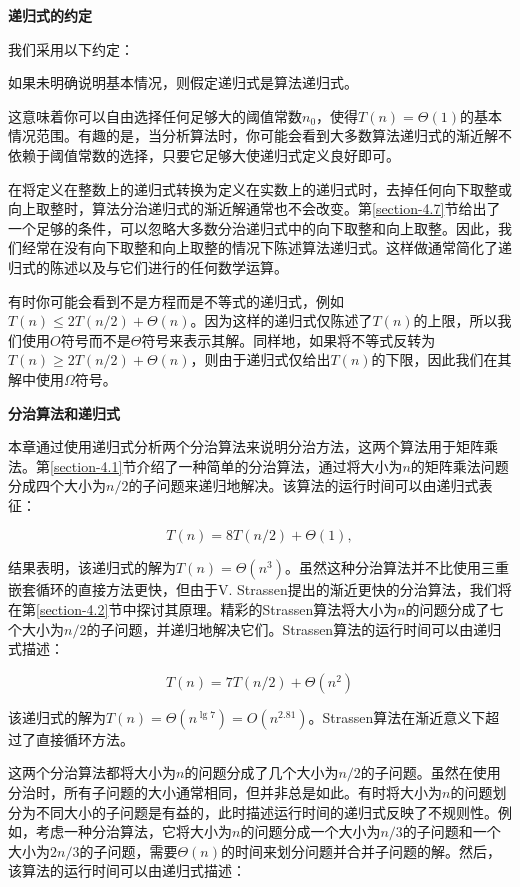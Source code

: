 \documentclass[lang=cn,newtx,10pt,scheme=chinese]{elegantbook}
\begin{document}
\textbf{递归式的约定}

我们采用以下约定：

\begin{tcolorbox}
如果未明确说明基本情况，则假定递归式是算法递归式。
\end{tcolorbox}

这意味着你可以自由选择任何足够大的阈值常数$n_0$，使得$T(n)=\Theta(1)$的基本情况范围。有趣的是，当分析算法时，你可能会看到大多数算法递归式的渐近解不依赖于阈值常数的选择，只要它足够大使递归式定义良好即可。

在将定义在整数上的递归式转换为定义在实数上的递归式时，去掉任何向下取整或向上取整时，算法分治递归式的渐近解通常也不会改变。第\ref{section-4.7}节给出了一个足够的条件，可以忽略大多数分治递归式中的向下取整和向上取整。因此，我们经常在没有向下取整和向上取整的情况下陈述算法递归式。这样做通常简化了递归式的陈述以及与它们进行的任何数学运算。

有时你可能会看到不是方程而是不等式的递归式，例如$T(n) \leq 2 T(n / 2)+\Theta(n)$。因为这样的递归式仅陈述了$T(n)$的上限，所以我们使用$O$符号而不是$\Theta$符号来表示其解。同样地，如果将不等式反转为$T(n)\geq 2T(n/2)+\Theta(n)$，则由于递归式仅给出$T(n)$的下限，因此我们在其解中使用$\Omega$符号。

\textbf{分治算法和递归式}

本章通过使用递归式分析两个分治算法来说明分治方法，这两个算法用于矩阵乘法。第\ref{section-4.1}节介绍了一种简单的分治算法，通过将大小为$n$的矩阵乘法问题分成四个大小为$n/2$的子问题来递归地解决。该算法的运行时间可以由递归式表征：

$$
T(n)=8 T(n / 2)+\Theta(1),
$$

结果表明，该递归式的解为$T(n)=\Theta(n^3)$。虽然这种分治算法并不比使用三重嵌套循环的直接方法更快，但由于V. Strassen提出的渐近更快的分治算法，我们将在第\ref{section-4.2}节中探讨其原理。精彩的Strassen算法将大小为$n$的问题分成了七个大小为$n/2$的子问题，并递归地解决它们。Strassen算法的运行时间可以由递归式描述：

$$
T(n)=7 T(n / 2)+\Theta(n^2)
$$

该递归式的解为$T(n)=\Theta(n^{\lg 7})=O(n^{2.81})$。Strassen算法在渐近意义下超过了直接循环方法。

这两个分治算法都将大小为$n$的问题分成了几个大小为$n/2$的子问题。虽然在使用分治时，所有子问题的大小通常相同，但并非总是如此。有时将大小为$n$的问题划分为不同大小的子问题是有益的，此时描述运行时间的递归式反映了不规则性。例如，考虑一种分治算法，它将大小为$n$的问题分成一个大小为$n/3$的子问题和一个大小为$2n/3$的子问题，需要$\Theta(n)$的时间来划分问题并合并子问题的解。然后，该算法的运行时间可以由递归式描述：
\end{document}
